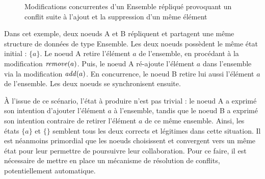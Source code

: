 \begin{figure}[!ht]

  \centering
  \caption{Modifications concurrentes d'un Ensemble répliqué provoquant un conflit suite à l'ajout et la suppression d'un même élément}
  \label{fig:set-conflict}
\end{figure}

Dans cet exemple, deux noeuds A et B répliquent et partagent une même structure de données de type Ensemble.
Les deux noeuds possèdent le même état initial : $\{a\}$.
Le noeud A retire l'élément $a$ de l'ensemble, en procédant à la modification $\mathit{remove}(a)$.
Puis, le noeud A ré-ajoute l'élément $a$ dans l'ensemble via la modification $\mathit{add}(a)$.
En concurrence, le noeud B retire lui aussi l'élément $a$ de l'ensemble.
Les deux noeuds se synchronisent ensuite.

À l'issue de ce scénario, l'état à produire n'est pas trivial : le noeud A a exprimé son intention d'ajouter l'élément $a$ à l'ensemble, tandis que le noeud B a exprimé son intention contraire de retirer l'élément $a$ de ce même ensemble.
Ainsi, les états $\{a\}$ et $\{\}$ semblent tous les deux corrects et légitimes dans cette situation.
Il est néanmoins primordial que les noeuds choisissent et convergent vers un même état pour leur permettre de poursuivre leur collaboration.
Pour ce faire, il est nécessaire de mettre en place un mécanisme de résolution de conflits, potentiellement automatique.

